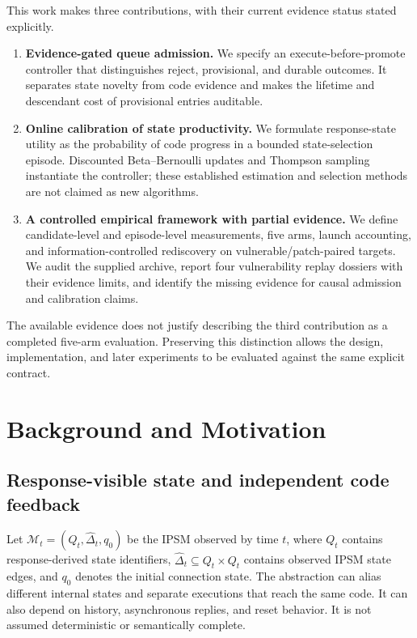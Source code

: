 \documentclass[final,5p,times,number]{elsarticle}
\begin{document}
This work makes three contributions, with their current evidence status stated explicitly.
\begin{enumerate}
\item \textbf{Evidence-gated queue admission.} We specify an execute-before-promote controller that distinguishes reject, provisional, and durable outcomes. It separates state novelty from code evidence and makes the lifetime and descendant cost of provisional entries auditable.
\item \textbf{Online calibration of state productivity.} We formulate response-state utility as the probability of code progress in a bounded state-selection episode. Discounted Beta--Bernoulli updates and Thompson sampling instantiate the controller; these established estimation and selection methods are not claimed as new algorithms.
\item \textbf{A controlled empirical framework with partial evidence.} We define candidate-level and episode-level measurements, five arms, launch accounting, and information-controlled rediscovery on vulnerable/patch-paired targets. We audit the supplied archive, report four vulnerability replay dossiers with their evidence limits, and identify the missing evidence for causal admission and calibration claims.
\end{enumerate}
The available evidence does not justify describing the third contribution as a completed five-arm evaluation. Preserving this distinction allows the design, implementation, and later experiments to be evaluated against the same explicit contract.

\section{Background and Motivation}
\label{sec:motivation}
\subsection{Response-visible state and independent code feedback}
Let $\mathcal{M}_t=(Q_t,\widehat{\Delta}_t,q_0)$ be the IPSM observed by time $t$, where $Q_t$ contains response-derived state identifiers, $\widehat{\Delta}_t\subseteq Q_t\times Q_t$ contains observed IPSM state edges, and $q_0$ denotes the initial connection state. The abstraction can alias different internal states and separate executions that reach the same code. It can also depend on history, asynchronous replies, and reset behavior. It is not assumed deterministic or semantically complete.
\end{document}
